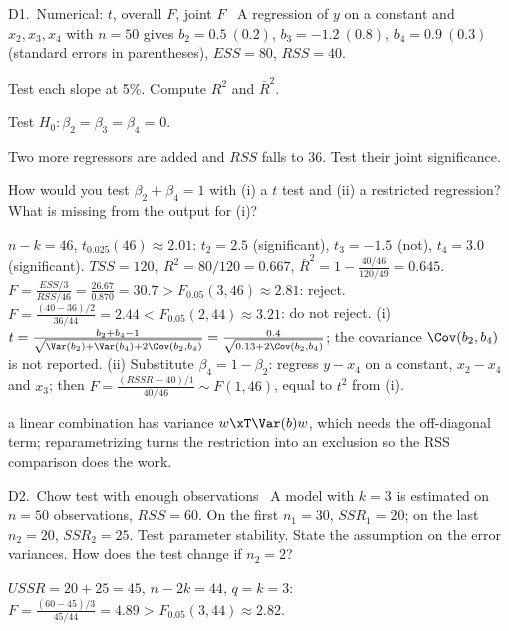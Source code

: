 \begin{qbox}{D1.\ Numerical: $t$, overall $F$, joint $F$}{\likely\ \newtag}
A regression of $y$ on a constant and $x_{2},x_{3},x_{4}$ with $n=50$ gives $b_{2}=0.5\ (0.2)$, $b_{3}=-1.2\ (0.8)$,
$b_{4}=0.9\ (0.3)$ (standard errors in parentheses), $ESS=80$, $RSS=40$.
\begin{flatlist}
  \item[(a)] Test each slope at 5\%. Compute $R^{2}$ and $\bar R^{2}$.
  \item[(b)] Test $H_{0}:\beta_{2}=\beta_{3}=\beta_{4}=0$.
  \item[(c)] Two more regressors are added and $RSS$ falls to $36$. Test their joint significance.
  \item[(d)] How would you test $\beta_{2}+\beta_{4}=1$ with (i) a $t$ test and (ii) a restricted regression?
        What is missing from the output for (i)?
\end{flatlist}
\end{qbox}
\begin{solbox}
 $n-k=46$, $t_{0.025}(46)\approx2.01$: $t_{2}=2.5$ (significant), $t_{3}=-1.5$ (not), $t_{4}=3.0$ (significant).
$TSS=120$, $R^{2}=80/120=0.667$, $\bar R^{2}=1-\frac{40/46}{120/49}=0.645$.
 $F=\frac{ESS/3}{RSS/46}=\frac{26.67}{0.870}=30.7>F_{0.05}(3,46)\approx2.81$: reject.
 $F=\frac{(40-36)/2}{36/44}=2.44<F_{0.05}(2,44)\approx3.21$: do not reject.
 (i) $t=\frac{b_{2}+b_{4}-1}{\sqrt{\Var(b_{2})+\Var(b_{4})+2\Cov(b_{2},b_{4})}}=\frac{0.4}{\sqrt{0.13+2\Cov(b_{2},b_{4})}}$;
the covariance $\Cov(b_{2},b_{4})$ is not reported. (ii) Substitute $\beta_{4}=1-\beta_{2}$: regress $y-x_{4}$ on a constant, $x_{2}-x_{4}$ and $x_{3}$;
then $F=\frac{(RSSR-40)/1}{40/46}\sim F(1,46)$, equal to $t^{2}$ from (i).
\begin{why}\Why a linear combination has variance $w\xT\Var(b)w$, which needs the off-diagonal term; reparametrizing turns the restriction into an
exclusion so the RSS comparison does the work.\end{why}
\end{solbox}

\begin{qbox}{D2.\ Chow test with enough observations}{\likely\ \newtag}
A model with $k=3$ is estimated on $n=50$ observations, $RSS=60$. On the first $n_{1}=30$, $SSR_{1}=20$; on the last $n_{2}=20$,
$SSR_{2}=25$. Test parameter stability. State the assumption on the error variances. How does the test change if $n_{2}=2$?
\end{qbox}
\begin{solbox}
$USSR=20+25=45$, $n-2k=44$, $q=k=3$: $F=\frac{(60-45)/3}{45/44}=4.89>F_{0.05}(3,44)\approx2.82$.
\end{solbox}

